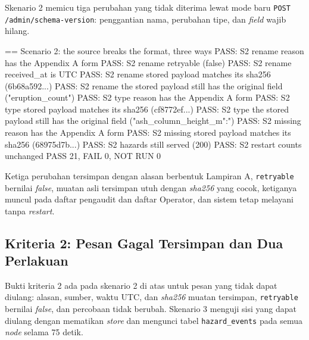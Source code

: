 Skenario 2 memicu tiga perubahan yang tidak diterima lewat mode baru \texttt{POST /admin/schema-version}: penggantian nama, perubahan tipe, dan \textit{field} wajib hilang.

\begin{codebox}
== Scenario 2: the source breaks the format, three ways
PASS: S2 rename reason has the Appendix A form
PASS: S2 rename retryable (false)
PASS: S2 rename received_at is UTC
PASS: S2 rename stored payload matches its sha256 (6b68a592...)
PASS: S2 rename the stored payload still has the original field ("eruption_count")
PASS: S2 type reason has the Appendix A form
PASS: S2 type stored payload matches its sha256 (cf8772ef...)
PASS: S2 type the stored payload still has the original field ("ash_column_height_m":")
PASS: S2 missing reason has the Appendix A form
PASS: S2 missing stored payload matches its sha256 (68975d7b...)
PASS: S2 hazards still served (200)
PASS: S2 restart counts unchanged
PASS 21, FAIL 0, NOT RUN 0
\end{codebox}

Ketiga perubahan tersimpan dengan alasan berbentuk Lampiran A, \texttt{retryable} bernilai \textit{false}, muatan asli tersimpan utuh dengan \textit{sha256} yang cocok, ketiganya muncul pada daftar pengaudit dan daftar Operator, dan sistem tetap melayani tanpa \textit{restart}.

\subsection{Kriteria 2: Pesan Gagal Tersimpan dan Dua Perlakuan}

Bukti kriteria 2 ada pada skenario 2 di atas untuk pesan yang tidak dapat diulang: alasan, sumber, waktu UTC, dan \textit{sha256} muatan tersimpan, \texttt{retryable} bernilai \textit{false}, dan percobaan tidak berubah. Skenario 3 menguji sisi yang dapat diulang dengan mematikan \textit{store} dan mengunci tabel \texttt{hazard\_events} pada semua \textit{node} selama 75 detik.


